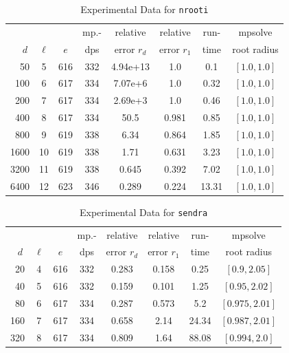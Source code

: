 \documentclass[runningheads]{llncs}
\begin{document}
\begin{table}
\caption{Experimental Data for \texttt{nrooti}} %
\label{tab:nrooti}
\vskip -0.15in
\begin{center}
\begin{small}
\begin{sc}
\begin{tabular}{rccccccc}
\toprule
&  &  & mp.-& relative  & relative & run- & mpsolve \\
$d~$& $\ell$& $e$ & dps&error $r_d$       & error $r_1$ &time& root radius\\
\midrule
 50 & 5 & 616 & 332 & 4.94e+13 & 1.0 & 0.1 & $[1.0, 1.0]$\\
 100 & 6 & 617 & 334 & 7.07e+6 & 1.0 & 0.32 & $[1.0, 1.0]$\\
  200 & 7 & 617 & 334 & 2.69e+3 & 1.0 & 0.46 & $[1.0, 1.0]$\\
 400 & 8 & 617 & 334 & 50.5 & 0.981 & 0.85 & $[1.0, 1.0]$\\
 800 & 9 & 619 & 338 & 6.34 & 0.864 & 1.85 & $[1.0, 1.0]$\\
 1600 & 10 & 619 & 338 & 1.71 & 0.631 & 3.23 & $[1.0, 1.0]$\\
 3200 & 11 & 619 & 338 & 0.645 & 0.392 & 7.02 & $[1.0, 1.0]$\\
 6400 & 12 & 623 & 346 & 0.289 & 0.224 & 13.31 & $[1.0, 1.0]$\\
\bottomrule
\end{tabular}
\end{sc}
\end{small}
\end{center}
\vskip 0.05in
\end{table}

\begin{table}
\caption{Experimental Data for \texttt{sendra}} %
\label{tab:sendra}
\vskip -0.15in
\begin{center}
\begin{small}
\begin{sc}
\begin{tabular}{rccccccc}
\toprule
&  &  & mp.-& relative  & relative & run- & mpsolve \\
$d~$& $\ell$& $e$ & dps&error $r_d$       & error $r_1$ &time& root radius\\
\midrule
 20 & 4 & 616 & 332 & 0.283 & 0.158 & 0.25 & $[0.9, 2.05]$\\
 40 & 5 & 616 & 332 & 0.159 & 0.101 & 1.25 & $[0.95, 2.02]$\\
 80 & 6 & 617 & 334 & 0.287 & 0.573 & 5.2 & $[0.975, 2.01]$\\
 160 & 7 & 617 & 334 & 0.658 & 2.14 & 24.34 & $[0.987, 2.01]$\\
 320 & 8 & 617 & 334 & 0.809 & 1.64 & 88.08 & $[0.994, 2.0]$\\
\bottomrule
\end{tabular}
\end{sc}
\end{small}
\end{center}
\vskip 0.05in
\end{table}
\end{document}
